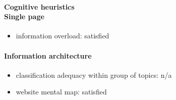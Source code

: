 \begin{enumerate}
	\paragraph*{Cognitive heuristics \\ Single page}
	\begin{itemize}
		\item information overload: satisfied
	\end{itemize}	

	\paragraph*{Information architecture}
	\begin{itemize}
		\item classification adequacy within group of topics: n/a
		\item website mental map: satisfied
	\end{itemize}
\end{enumerate}

\newpage
